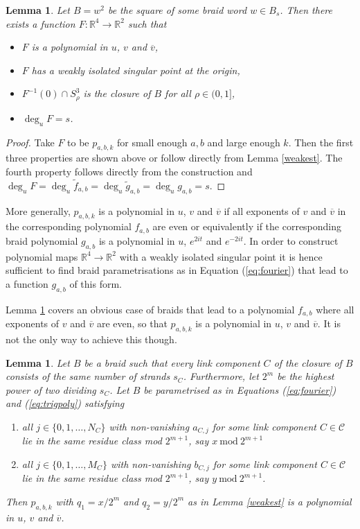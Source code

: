 \documentclass[notitlepage,12pt]{revtex4-1}
\newtheorem{lemma}[theorem]{\bf Lemma}
\begin{document}
\begin{lemma}
\label{evenweak}
Let $B=w^2$ be the square of some braid word $w\in B_{s}$. Then there exists a function $F:\mathbb{R}^{4}\to\mathbb{R}^{2}$ such that 
\begin{itemize}
\item $F$ is a polynomial in $u$, $v$ and $\overline{v}$,
\item $F$ has a weakly isolated singular point at the origin,
\item $F^{-1}(0)\cap S^{3}_{\rho}$ is the closure of $B$ for all $\rho\in(0,1]$,
\item $\deg_{u}F=s$.
\end{itemize}
\end{lemma} 
\begin{proof}
Take $F$ to be $p_{a,b,k}$ for small enough $a,b$ and large enough $k$. Then the first three properties are shown above or follow directly from Lemma \ref{weakest}. The fourth property follows directly from the construction and $\deg_{u}F=\deg_{u}\tilde{f}_{a,b}=\deg_{u}\tilde{g}_{a,b}=\deg_{u}g_{a,b}=s$.
\end{proof}

More generally, $p_{a,b,k}$ is a polynomial in $u$, $v$ and $\overline{v}$ if all exponents of $v$ and $\overline{v}$ in the corresponding polynomial $f_{a,b}$ are even or equivalently if the corresponding braid polynomial $g_{a,b}$ is a polynomial in $u$, $e^{2it}$ and $e^{-2it}$. In order to construct polynomial maps $\mathbb{R}^{4}\to\mathbb{R}^{2}$ with a weakly isolated singular point it is hence sufficient to find braid parametrisations as in Equation (\ref{eq:fourier}) that lead to a function $g_{a,b}$ of this form.

Lemma \ref{evenweak} covers an obvious case of braids that lead to a polynomial $f_{a,b}$ where all exponents of $v$ and $\overline{v}$ are even, so that $p_{a,b,k}$ is a polynomial in $u$, $v$ and $\overline{v}$. It is not the only way to achieve this though.

\begin{lemma}
\label{odd}
Let $B$ be a braid such that every link component $C$ of the closure of $B$ consists of the same number of strands $s_{C}$. Furthermore, let $2^m$ be the highest power of two dividing $s_{C}$. Let $B$ be parametrised as in Equations (\ref{eq:fourier}) and (\ref{eq:trigpoly}) satisfying
\begin{enumerate}[label=(\roman*)]
\item all $j\in\{0,1,\ldots,N_{C}\}$ with non-vanishing $a_{C,j}$ for some link component $C\in\mathcal{C}$  lie in the same residue class mod $2^{m+1}$, say $x\ \mathrm{mod}\ 2^{m+1}$
\label{con1}
\item all $j\in\{0,1,\ldots,M_{C}\}$ with non-vanishing $b_{C,j}$ for some link component $C\in\mathcal{C}$  lie in the same residue class mod $2^{m+1}$, say $y\ \mathrm{mod}\  2^{m+1}$.
\label{con2}
\end{enumerate}

Then $p_{a,b,k}$ with $q_{1}=x/2^m$ and $q_{2}=y/2^m$ as in Lemma \ref{weakest} is a polynomial in $u$, $v$ and $\overline{v}$.
\end{lemma}
\end{document}
